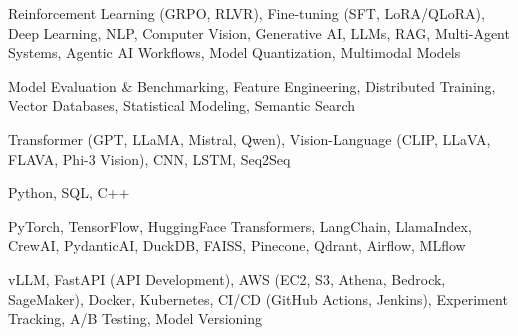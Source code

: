 \documentclass[letter,10pt]{article}
\begin{document}
 Reinforcement Learning (GRPO, RLVR), Fine-tuning (SFT, LoRA/QLoRA), Deep Learning, NLP, Computer Vision, Generative AI, LLMs, RAG, Multi-Agent Systems, Agentic AI Workflows, Model Quantization, Multimodal Models\par\vspace{2pt}

 Model Evaluation \& Benchmarking, Feature Engineering, Distributed Training, Vector Databases, Statistical Modeling, Semantic Search\par\vspace{2pt}

 Transformer (GPT, LLaMA, Mistral, Qwen), Vision-Language (CLIP, LLaVA, FLAVA, Phi-3 Vision), CNN, LSTM, Seq2Seq\par\vspace{2pt}

 Python, SQL, C++\par\vspace{2pt}

 PyTorch, TensorFlow, HuggingFace Transformers, LangChain, LlamaIndex, CrewAI, PydanticAI, DuckDB, FAISS, Pinecone, Qdrant, Airflow, MLflow\par\vspace{2pt}

 vLLM, FastAPI (API Development), AWS (EC2, S3, Athena, Bedrock, SageMaker), Docker, Kubernetes, CI/CD (GitHub Actions, Jenkins), Experiment Tracking, A/B Testing, Model Versioning
\end{document}
